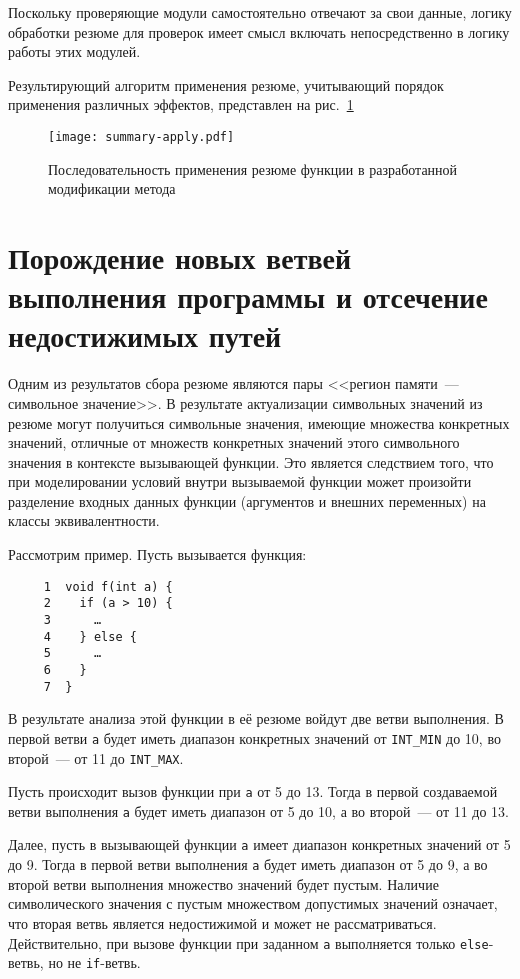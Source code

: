 Поскольку проверяющие модули самостоятельно отвечают за свои данные, логику обработки резюме для проверок имеет смысл включать непосредственно в логику работы этих модулей.

Результирующий алгоритм применения резюме, учитывающий порядок применения различных эффектов, представлен на рис.~\ref{pic:summary-apply}


\begin{figure}
   \centering
   \texttt{[image: summary-apply.pdf]}
   \caption{Последовательность применения резюме функции в разработанной модификации метода}\label{pic:summary-apply}
\end{figure}


\section{Порождение новых ветвей выполнения программы и отсечение недостижимых путей}

Одним из результатов сбора резюме являются пары <<регион памяти~--- символьное значение>>. В результате актуализации символьных значений из резюме могут получиться символьные значения, имеющие множества конкретных значений, отличные от множеств конкретных значений этого символьного значения в контексте вызывающей функции. Это является следствием того, что при моделировании условий внутри вызываемой функции может произойти разделение входных данных функции (аргументов и внешних переменных) на классы эквивалентности.

Рассмотрим пример. Пусть вызывается функция:

\begin{verbatim}
     1  void f(int a) {
     2    if (a > 10) {
     3      …
     4    } else {
     5      …
     6    }
     7  }
\end{verbatim}

В результате анализа этой функции в её резюме войдут две ветви выполнения. В первой ветви \texttt{a} будет иметь диапазон конкретных значений от \texttt{INT\_MIN} до 10, во второй~--- от 11 до \texttt{INT\_MAX}.

Пусть происходит вызов функции при \texttt{a} от 5 до 13. Тогда в первой создаваемой ветви выполнения \texttt{а} будет иметь диапазон от 5 до 10, а во второй~--- от 11 до 13.

Далее, пусть в вызывающей функции \texttt{a} имеет диапазон конкретных значений от 5 до 9. Тогда в первой ветви выполнения \texttt{a} будет иметь диапазон от 5 до 9, а во второй ветви выполнения множество значений будет пустым. Наличие символического значения с пустым множеством допустимых значений означает, что вторая ветвь является недостижимой и может не рассматриваться. Действительно, при вызове функции при заданном \texttt{а} выполняется только \texttt{else}-ветвь, но не \texttt{if}-ветвь.

